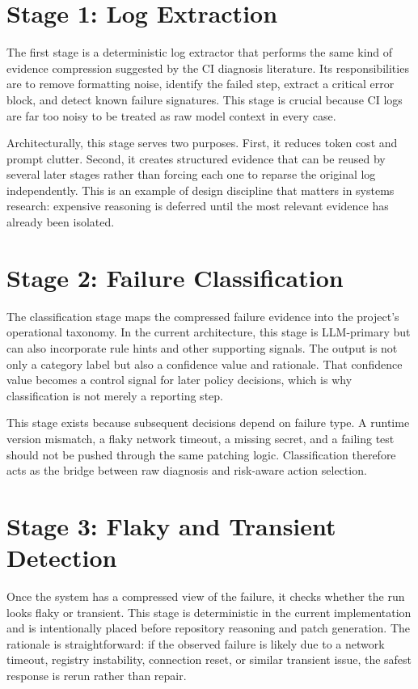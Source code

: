 \section{Stage 1: Log Extraction}

The first stage is a deterministic log extractor that performs the same kind of evidence compression suggested by
the CI diagnosis literature. Its responsibilities are to remove formatting noise, identify the failed step,
extract a critical error block, and detect known failure signatures. This stage is crucial because CI logs are
far too noisy to be treated as raw model context in every case.

Architecturally, this stage serves two purposes. First, it reduces token cost and prompt clutter. Second, it
creates structured evidence that can be reused by several later stages rather than forcing each one to reparse
the original log independently. This is an example of design discipline that matters in systems research:
expensive reasoning is deferred until the most relevant evidence has already been isolated.

\section{Stage 2: Failure Classification}

The classification stage maps the compressed failure evidence into the project's operational taxonomy. In the
current architecture, this stage is LLM-primary but can also incorporate rule hints and other supporting
signals. The output is not only a category label but also a confidence value and rationale. That confidence
value becomes a control signal for later policy decisions, which is why classification is not merely a reporting
step.

This stage exists because subsequent decisions depend on failure type. A runtime version mismatch, a flaky
network timeout, a missing secret, and a failing test should not be pushed through the same patching logic.
Classification therefore acts as the bridge between raw diagnosis and risk-aware action selection.

\section{Stage 3: Flaky and Transient Detection}

Once the system has a compressed view of the failure, it checks whether the run looks flaky or transient. This
stage is deterministic in the current implementation and is intentionally placed before repository reasoning and
patch generation. The rationale is straightforward: if the observed failure is likely due to a network timeout,
registry instability, connection reset, or similar transient issue, the safest response is rerun rather than
repair.

